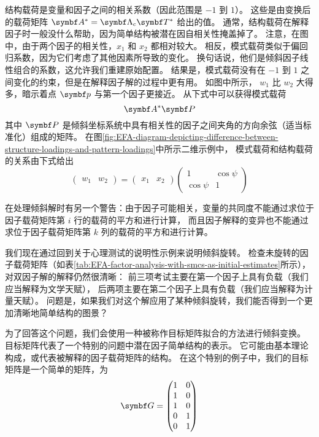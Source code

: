 结构载荷是变量和因子之间的相关系数（因此范围是 $ -1 $ 到 $ 1 $）。
这些是由变换后的载荷矩阵 $ \vA^* = \vLambda_c\vT^* $ 给出的值。
通常，结构载荷在解释因子时一般没什么帮助，因为简单结构被潜在因自相关性掩盖掉了。
注意，在图中，由于两个因子的相关性，$ x_1 $ 和 $ x_2 $ 都相对较大。
相反，模式载荷类似于偏回归系数，因为它们考虑了其他因素所导致的变化。
换句话说，他们是倾斜因子线性组合的系数，这允许我们重建原始配置。
结果是，模式载荷没有在 $ -1 $ 到 $ 1 $ 之间变化的约束，但是在解释因子解的过程中更有用。
如图中所示， $ w_1 $ 比 $ w_2 $ 大得多，暗示着点 $ \vp $ 与第一个因子更接近。
从下式中可以获得模式载荷
\begin{equation}
    \vA^*\vP
\end{equation}
其中 $ \vP $ 是倾斜坐标系统中具有相关性的因子之间夹角的方向余弦（适当标准化）组成的矩阵。
在图\ref{fig:EFA-diagram-depicting-difference-between-structure-loadings-and-pattern-loadings}中所示二维示例中，
模式载荷和结构载荷的关系由下式给出
\begin{equation}
    \begin{pmatrix}
        w_1 & w_2
    \end{pmatrix} = \begin{pmatrix}
        x_1 & x_2
    \end{pmatrix} \begin{pmatrix}
        1 & \cos\psi \\
        \cos\psi & 1
    \end{pmatrix}
\end{equation}

在处理倾斜解时有另一个警告：由于因子可能相关，变量的共同度不能通过求位于因子载荷矩阵第 $ i $ 行的载荷的平方和进行计算，
而且因子解释的变异也不能通过求位于因子载荷矩阵第 $ k $ 列的载荷的平方和进行计算。

我们现在通过回到关于心理测试的说明性示例来说明倾斜旋转。
检查未旋转的因子载荷矩阵（如表\ref{tab:EFA-factor-analysis-with-smcs-as-initial-estimates}所示），
对双因子解的解释仍然很清晰：
前三项考试主要在第一个因子上具有负载（我们应当解释为文学天赋），
后两项主要在第二个因子上具有负载（我们应当解释为计量天赋）。
问题是，如果我们对这个解应用了某种倾斜旋转，我们能否得到一个更加清晰地简单结构的图景？

为了回答这个问题，我们会使用一种被称作目标矩阵拟合的方法进行倾斜变换。
目标矩阵代表了一个特别的问题中潜在因子简单结构的表示。
它可能由基本理论构成，或代表被解释的因子载荷矩阵的结构。
在这个特别的例子中，我们的目标矩阵是一个简单的矩阵，为
\begin{equation}
    \vG = \begin{pmatrix}
        1 & 0 \\ 
        1 & 0 \\ 
        1 & 0 \\ 
        0 & 1 \\ 
        0 & 1 \\ 
    \end{pmatrix}
\end{equation}

